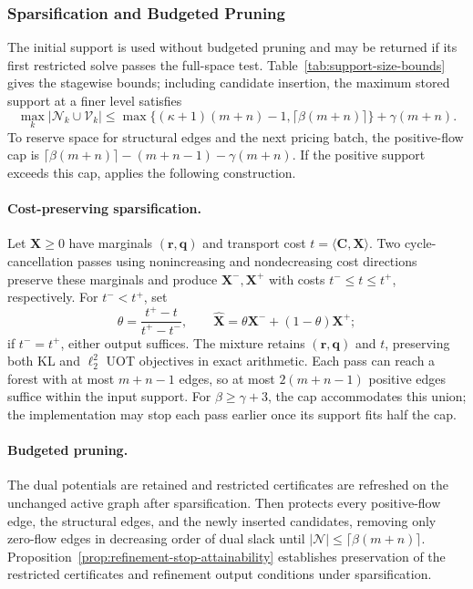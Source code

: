 \subsubsection{Sparsification and Budgeted Pruning}
\label{app:hierarchy-pruning}

The initial support is used without budgeted pruning and may be returned if its first restricted solve passes the full-space test.
Table~\ref{tab:support-size-bounds} gives the stagewise bounds; including candidate insertion, the maximum stored support at a finer level satisfies
\begin{equation*}
\max_k|\mathcal N_k\cup\mathcal V_k|\leq\max\{(\kappa+1)(m+n)-1,\lceil\beta(m+n)\rceil\}+\gamma(m+n).
\end{equation*}
To reserve space for structural edges and the next pricing batch, the positive-flow cap is $\lceil\beta(m+n)\rceil-(m+n-1)-\gamma(m+n)$.
If the positive support exceeds this cap, \sparsify applies the following construction.

\paragraph{Cost-preserving sparsification.}
Let $\mathbf X\geq0$ have marginals $(\mathbf r,\mathbf q)$ and transport cost $t=\langle\mathbf C,\mathbf X\rangle$.
Two cycle-cancellation passes using nonincreasing and nondecreasing cost directions preserve these marginals and produce $\mathbf X^-,\mathbf X^+$ with costs $t^-\leq t\leq t^+$, respectively.
For $t^-<t^+$, set
\begin{equation*}
\theta=\frac{t^+-t}{t^+-t^-},\qquad
\widehat{\mathbf X}=\theta\mathbf X^-+(1-\theta)\mathbf X^+;
\end{equation*}
if $t^-=t^+$, either output suffices.
The mixture retains $(\mathbf r,\mathbf q)$ and $t$, preserving both KL and $\ell_2^2$ UOT objectives in exact arithmetic.
Each pass can reach a forest with at most $m+n-1$ edges, so at most $2(m+n-1)$ positive edges suffice within the input support.
For $\beta\geq\gamma+3$, the cap accommodates this union; the implementation may stop each pass earlier once its support fits half the cap.

\paragraph{Budgeted pruning.}
The dual potentials are retained and restricted certificates are refreshed on the unchanged active graph after sparsification.
Then \prune protects every positive-flow edge, the structural edges, and the newly inserted candidates, removing only zero-flow edges in decreasing order of dual slack until $|\mathcal N|\leq\lceil\beta(m+n)\rceil$.
Proposition~\ref{prop:refinement-stop-attainability} establishes preservation of the restricted certificates and refinement output conditions under sparsification.

